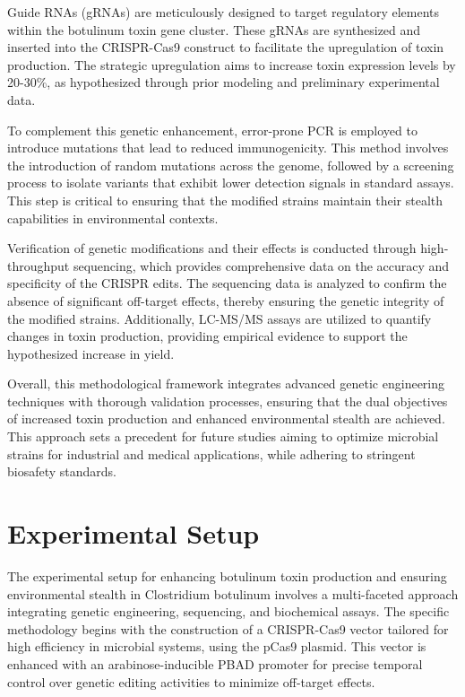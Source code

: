 \documentclass{article}
\begin{document}
Guide RNAs (gRNAs) are meticulously designed to target regulatory elements within the botulinum toxin gene cluster. These gRNAs are synthesized and inserted into the CRISPR-Cas9 construct to facilitate the upregulation of toxin production. The strategic upregulation aims to increase toxin expression levels by 20-30\%, as hypothesized through prior modeling and preliminary experimental data.

To complement this genetic enhancement, error-prone PCR is employed to introduce mutations that lead to reduced immunogenicity. This method involves the introduction of random mutations across the genome, followed by a screening process to isolate variants that exhibit lower detection signals in standard assays. This step is critical to ensuring that the modified strains maintain their stealth capabilities in environmental contexts.

Verification of genetic modifications and their effects is conducted through high-throughput sequencing, which provides comprehensive data on the accuracy and specificity of the CRISPR edits. The sequencing data is analyzed to confirm the absence of significant off-target effects, thereby ensuring the genetic integrity of the modified strains. Additionally, LC-MS/MS assays are utilized to quantify changes in toxin production, providing empirical evidence to support the hypothesized increase in yield.

Overall, this methodological framework integrates advanced genetic engineering techniques with thorough validation processes, ensuring that the dual objectives of increased toxin production and enhanced environmental stealth are achieved. This approach sets a precedent for future studies aiming to optimize microbial strains for industrial and medical applications, while adhering to stringent biosafety standards.

\section{Experimental Setup}
The experimental setup for enhancing botulinum toxin production and ensuring environmental stealth in Clostridium botulinum involves a multi-faceted approach integrating genetic engineering, sequencing, and biochemical assays. The specific methodology begins with the construction of a CRISPR-Cas9 vector tailored for high efficiency in microbial systems, using the pCas9 plasmid. This vector is enhanced with an arabinose-inducible PBAD promoter for precise temporal control over genetic editing activities to minimize off-target effects.
\end{document}
